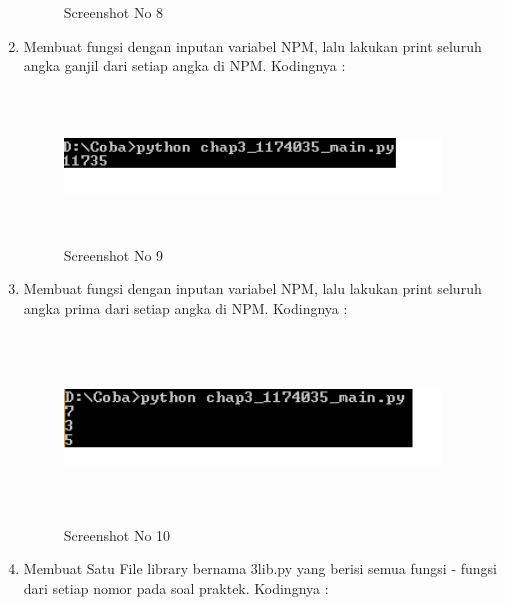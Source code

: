 \begin{enumerate}
\begin{figure}[!htbp]
        \caption{Screenshot No 8}
        \label{1174035_8}
	\end{figure}
	\item Membuat fungsi dengan inputan variabel NPM, lalu lakukan print seluruh angka ganjil dari setiap angka di NPM. Kodingnya : 
	
	\begin{figure}[!htbp]
        \centering
        \includegraphics[height=4cm, width=10cm]{figures/chapter3/1174035_9.png}
        \caption{Screenshot No 9}
        \label{1174035_9}
	\end{figure}
	\item Membuat fungsi dengan inputan variabel NPM, lalu lakukan print seluruh angka prima dari setiap angka di NPM. Kodingnya : 
	
	\begin{figure}[!htbp]
        \centering
        \includegraphics[height=5cm, width=10cm]{figures/chapter3/1174035_10.png}
        \caption{Screenshot No 10}
        \label{1174035_10}
	\end{figure}
	\item Membuat Satu File library bernama 3lib.py yang berisi semua fungsi - fungsi dari setiap nomor pada soal praktek. Kodingnya : 	
	
	
	

\end{enumerate}
